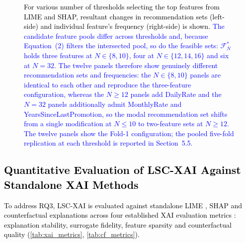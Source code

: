 \documentclass[a4paper,fleqn]{cas-sc}
\begin{document}
\begin{figure}[pos=H]
\caption{\textcolor{black}{For various number of thresholds selecting the top features from LIME and SHAP, resultant changes in recommendation sets (left-side) and individual feature's frequency (right-side) is shown. \textcolor{blue}{The candidate feature pools differ across thresholds and, because Equation~(2) filters the intersected pool, so do the feasible sets: $\mathcal{F}^*_N$ holds three features at $N \in \{8,10\}$, four at $N \in \{12,14,16\}$ and six at $N = 32$. The twelve panels therefore show genuinely different recommendation sets and frequencies: the $N \in \{8,10\}$ panels are identical to each other and reproduce the three-feature configuration, whereas the $N \ge 12$ panels add DailyRate and the $N = 32$ panels additionally admit MonthlyRate and YearsSinceLastPromotion, so the modal recommendation set shifts from a single modification at $N \le 10$ to two-feature sets at $N \ge 12$. \textcolor{blue}{The twelve panels show the Fold-1 configuration; the pooled five-fold replication at each threshold is reported in Section~5.5.}}}}
    \label{fig:sens_analy}
\end{figure}

\subsection{\textcolor{black}{Quantitative Evaluation of LSC-XAI Against Standalone XAI Methods}}
\label{subsec:quant_eval_lsc_xai}
\textcolor{black}{To address RQ3, LSC-XAI is evaluated against standalone LIME \cite{ribeiro2016should}, SHAP \cite{lundberg2017shap} and counterfactual explanations \cite{wachter2017counterfactual} across four established XAI evaluation metrics \cite{nauta2023evaluationsurvey}: explanation stability, surrogate fidelity, feature sparsity and counterfactual quality (\cref{tab:xai_metrics}, \ref{tab:cf_metrics}).}
\end{document}
